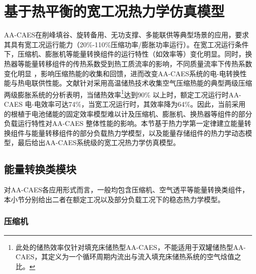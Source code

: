 
\section{基于热平衡的宽工况热力学仿真模型}
\label{sec:part-load-energy}
AA-CAES在削峰填谷、旋转备用、无功支撑、多能联供等典型场景的应用，要求其具有宽工况运行能力（20\%-110\%压缩功率/膨胀功率运行）。在宽工况运行条件下，压缩机、膨胀机等能量转换组件的运行特性（如效率等）变化明显。同时，换热器等能量转移组件的传热系数受到热工质流率的影响，不同质量流率下传热系数变化明显
\cite{HeatExch-Char-84,HE-Eff-CN-17}，影响压缩热能的收集和回馈，进而改变AA-CAES系统的电-电转换性能与热电联供性能。文献针对采用高温储热技术收集空气压缩热能的典型两级压缩两级膨胀系统的分析表明，当储热效率\footnote{此处的储热效率仅针对填充床储热型AA-CAES，不能适用于双罐储热型AA-CAES，其定义为一个循环周期内流出与流入填充床储热系统的空气焓值之比。}达到90\% 以上时，额定工况运行时AA-CAES 电-电效率可达74\%，当宽工况运行时，其效率降为64\%。因此，当前采用的根植于电池储能的固定效率模型难以计及压缩机、膨胀机、换热器等组件的部分负载运行特性对AA-CAES 整体性能的影响。本节基于热力学第一定律建立能量转换组件与能量转移组件的部分负载热力学模型，以及能量存储组件的热力学动态模型，最后给出AA-CAES系统级的宽工况热力学仿真模型。

\subsection{能量转换类模块}

对AA-CAES各应用形式而言，一般均包含压缩机、空气透平等能量转换类组件，本小节分别给出二者在额定工况以及部分负载工况下的稳态热力学模型。

\subsubsection{压缩机}
\label{sec:part-load-energy-compressor}

